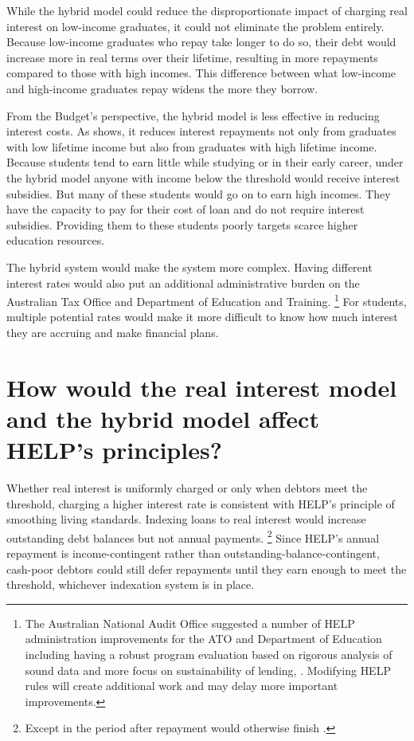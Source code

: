 \documentclass[embargoed]{grattan}
\begin{document}
While the hybrid model could reduce the disproportionate impact of charging real interest on low-income graduates, it could not eliminate the problem entirely.
Because low-income graduates who repay take longer to do so, their debt would increase more in real terms over their lifetime, resulting in more repayments compared to those with high incomes.
This difference between what low-income and high-income graduates repay widens the more they borrow.

From the Budget's perspective, the hybrid model is less effective in reducing interest costs.
As  shows, it reduces interest repayments not only from graduates with low lifetime income but also from graduates with high lifetime income.
Because students tend to earn little while studying or in their early career, under the hybrid model anyone with income below the threshold would receive interest subsidies.
But many of these students would go on to earn high incomes.
They have the capacity to pay for their cost of loan and do not require interest subsidies.
Providing them to these students poorly targets scarce higher education resources.

The hybrid system would make the system more complex.
Having different interest rates would also put an additional administrative burden on the Australian Tax Office and Department of Education and Training.%
\footnote{The Australian National Audit Office suggested a number of \gls{HELP} administration improvements for the \gls{ATO} and Department of Education including having a robust program evaluation based on rigorous analysis of sound data and more focus on sustainability of lending, \textcite[][p.~7, no.~7]{ANAO2016AdministrationHigherEducation}.
Modifying \gls{HELP} rules will create additional work and may delay more important improvements.} 
For students, multiple potential rates would make it more difficult to know how much interest they are accruing and make financial plans.

\section[How would the real interest model and the hybrid model affect {HELP}'s principles?]{How would the real interest model and the hybrid model affect \gls{HELP}'s principles?}\label{how-would-the-real-interest-model-and-the-hybrid-model-affect-helps-principles}

Whether real interest is uniformly charged or only when debtors meet the threshold, charging a higher interest rate is consistent with \gls{HELP}'s principle of smoothing living standards.
Indexing loans to real interest would increase outstanding debt balances but not annual payments.%
\footnote{Except in the period after repayment would otherwise finish .} 
Since \gls{HELP}'s annual repayment is income-contingent rather than outstanding-balance-contingent, cash-poor debtors could still defer repayments until they earn enough to meet the threshold, whichever indexation system is in place.
\end{document}
